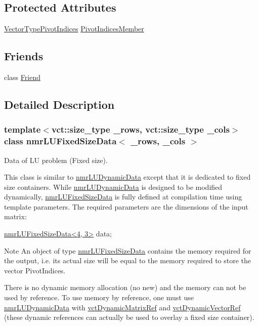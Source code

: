 \subsection*{Protected Attributes}
\begin{DoxyCompactItemize}
\item 
\hyperlink{classnmr_l_u_fixed_size_data_aa44bd56146e161d7b56d7f2001153ccb}{Vector\-Type\-Pivot\-Indices} \hyperlink{classnmr_l_u_fixed_size_data_afcd875504a4471fe5f0997ca8de617ad}{Pivot\-Indices\-Member}
\end{DoxyCompactItemize}
\subsection*{Friends}
\begin{DoxyCompactItemize}
\item 
class \hyperlink{classnmr_l_u_fixed_size_data_a7f8321d57e81bc613d5dbef3410ba70e}{Friend}
\end{DoxyCompactItemize}


\subsection{Detailed Description}
\subsubsection*{template$<$vct\-::size\-\_\-type \-\_\-rows, vct\-::size\-\_\-type \-\_\-cols$>$class nmr\-L\-U\-Fixed\-Size\-Data$<$ \-\_\-rows, \-\_\-cols $>$}

Data of L\-U problem (Fixed size). 

This class is similar to \hyperlink{classnmr_l_u_dynamic_data}{nmr\-L\-U\-Dynamic\-Data} except that it is dedicated to fixed size containers. While \hyperlink{classnmr_l_u_dynamic_data}{nmr\-L\-U\-Dynamic\-Data} is designed to be modified dynamically, \hyperlink{classnmr_l_u_fixed_size_data}{nmr\-L\-U\-Fixed\-Size\-Data} is fully defined at compilation time using template parameters. The required parameters are the dimensions of the input matrix\-: 
\begin{DoxyCode}
\hyperlink{classnmr_l_u_fixed_size_data}{nmrLUFixedSizeData<4, 3>} data;
\end{DoxyCode}


\begin{DoxyNote}{Note}
An object of type \hyperlink{classnmr_l_u_fixed_size_data}{nmr\-L\-U\-Fixed\-Size\-Data} contains the memory required for the output, i.\-e. its actual size will be equal to the memory required to store the vector Pivot\-Indices.

There is no dynamic memory allocation (no {\ttfamily new}) and the memory can not be used by reference. To use memory by reference, one must use \hyperlink{classnmr_l_u_dynamic_data}{nmr\-L\-U\-Dynamic\-Data} with \hyperlink{classvct_dynamic_matrix_ref}{vct\-Dynamic\-Matrix\-Ref} and \hyperlink{classvct_dynamic_vector_ref}{vct\-Dynamic\-Vector\-Ref} (these dynamic references can actually be used to overlay a fixed size container). 
\end{DoxyNote}


